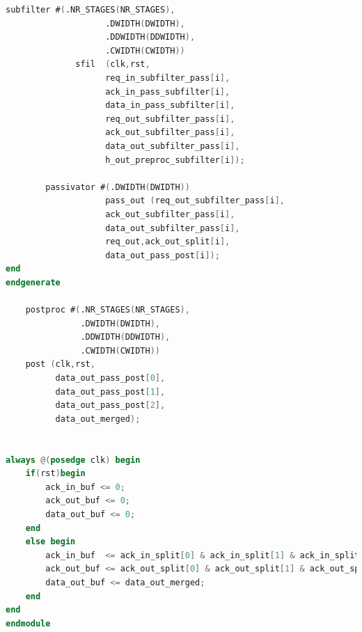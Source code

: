 \documentclass[a4paper,twoside,11pt, fleqn]{article}
\begin{document}
\begin{lstlisting}[language=Verilog]
    	subfilter #(.NR_STAGES(NR_STAGES),
    				.DWIDTH(DWIDTH),
    				.DDWIDTH(DDWIDTH),
    				.CWIDTH(CWIDTH))
              sfil	(clk,rst,
                    req_in_subfilter_pass[i],
                    ack_in_pass_subfilter[i],
                    data_in_pass_subfilter[i],
                    req_out_subfilter_pass[i],
                    ack_out_subfilter_pass[i],
                    data_out_subfilter_pass[i],
                    h_out_preproc_subfilter[i]);

    	passivator #(.DWIDTH(DWIDTH))
              		pass_out (req_out_subfilter_pass[i],
               		ack_out_subfilter_pass[i],
               		data_out_subfilter_pass[i],
               		req_out,ack_out_split[i],
               		data_out_pass_post[i]);
end
endgenerate

    postproc #(.NR_STAGES(NR_STAGES), 
    		   .DWIDTH(DWIDTH),
    		   .DDWIDTH(DDWIDTH),
    		   .CWIDTH(CWIDTH))
    post (clk,rst,
          data_out_pass_post[0], 
          data_out_pass_post[1], 
          data_out_pass_post[2],
          data_out_merged);


always @(posedge clk) begin
    if(rst)begin
        ack_in_buf <= 0;
        ack_out_buf <= 0;
        data_out_buf <= 0;
    end
    else begin
        ack_in_buf  <= ack_in_split[0] & ack_in_split[1] & ack_in_split[2];
        ack_out_buf <= ack_out_split[0] & ack_out_split[1] & ack_out_split[2];
        data_out_buf <= data_out_merged;
    end
end
endmodule
\end{lstlisting}

\newpage
\end{document}
